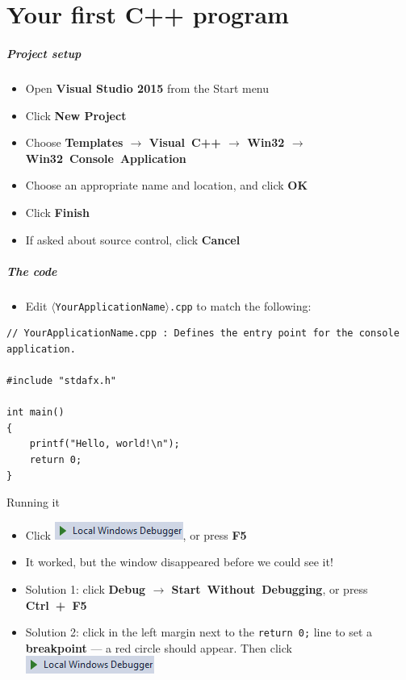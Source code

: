 \part{Your first C++ program}
\frame{\partpage}

\begin{frame}
	\frametitle{Project setup}
	\begin{itemize}
		\item Open \textbf{Visual Studio 2015} from the Start menu
		\item Click \textbf{New Project}
		\item Choose \textbf{Templates $\to$ Visual~C++ $\to$ Win32 $\to$ Win32~Console~Application}
		\item Choose an appropriate name and location, and click \textbf{OK}
		\item Click \textbf{Finish}
		\item If asked about source control, click \textbf{Cancel}
	\end{itemize}
\end{frame}

\begin{frame}[fragile]
	\frametitle{The code}
	\begin{itemize}
		\item Edit \texttt{$\langle$YourApplicationName$\rangle$.cpp} to match the following:
	\end{itemize}
	\begin{lstlisting}
// YourApplicationName.cpp : Defines the entry point for the console application.

#include "stdafx.h"

int main()
{
    printf("Hello, world!\n");
    return 0;
}
	\end{lstlisting}
\end{frame}

\begin{frame}[fragile]{Running it}
	\begin{itemize}
		\item Click \includegraphics[height=2ex]{run_button.png}, or press \textbf{F5} \pause
		\item It worked, but the window disappeared before we could see it! \pause
		\item Solution 1: click \textbf{Debug $\to$ Start~Without~Debugging}, or press \textbf{Ctrl~+~F5}
		\item Solution 2: click in the left margin next to the \lstinline{return 0;} line to set a \textbf{breakpoint} ---
			a red circle should appear. Then click \includegraphics[height=2ex]{run_button.png}
	\end{itemize}
\end{frame}

